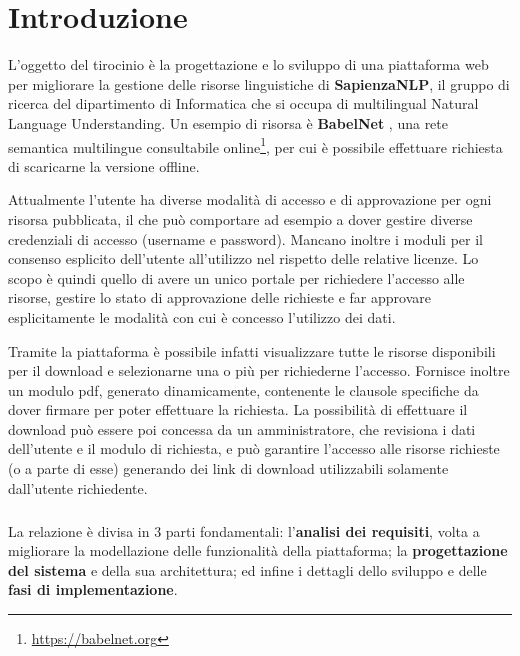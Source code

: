 
\chapter{Introduzione}

L'oggetto del tirocinio è la progettazione e lo sviluppo di una piattaforma web
per migliorare la gestione delle risorse linguistiche di \textbf{SapienzaNLP},
il gruppo di ricerca del dipartimento di Informatica che si occupa di multilingual
Natural Language Understanding.
Un esempio di risorsa è \textbf{BabelNet} \cite{NavigliPonzetto:12aij}, una rete
semantica multilingue consultabile online\footnote{\url{https://babelnet.org}},
per cui è possibile effettuare richiesta di scaricarne la versione offline.

Attualmente l'utente ha diverse modalità di accesso e di approvazione per ogni
risorsa pubblicata, il che può comportare ad esempio a dover gestire diverse
credenziali di accesso (username e password). Mancano inoltre i moduli per il
consenso esplicito dell'utente all'utilizzo nel rispetto delle relative licenze.
Lo scopo è quindi quello di avere un unico portale per richiedere l'accesso alle
risorse, gestire lo stato di approvazione delle richieste e far approvare
esplicitamente le modalità con cui è concesso l'utilizzo dei dati.

Tramite la piattaforma è possibile infatti visualizzare tutte le risorse
disponibili per il download e selezionarne una o più per richiederne l'accesso.
Fornisce inoltre un modulo pdf, generato dinamicamente, contenente le clausole
specifiche da dover firmare per poter effettuare la richiesta. La possibilità di
effettuare il download può essere poi concessa da un amministratore, che revisiona
i dati dell'utente e il modulo di richiesta, e può garantire l'accesso alle risorse
richieste (o a parte di esse) generando dei link di download utilizzabili
solamente dall'utente richiedente.

\paragraph{}
La relazione è divisa in 3 parti fondamentali: l'\textbf{analisi dei requisiti},
volta a migliorare la modellazione delle funzionalità della piattaforma; la
\textbf{progettazione del sistema} e della sua architettura; ed infine i dettagli
dello sviluppo e delle \textbf{fasi di implementazione}.